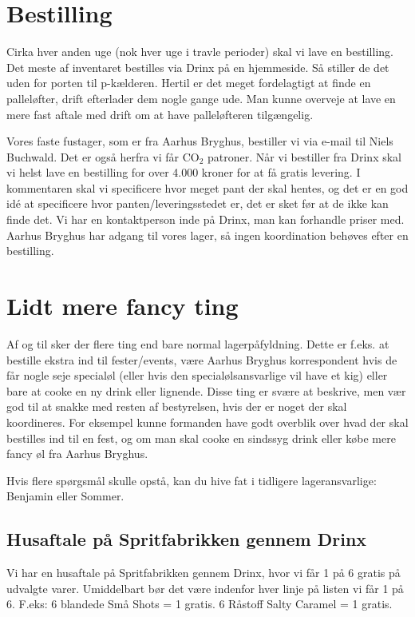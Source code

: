 \section{Bestilling}

Cirka hver anden uge (nok hver uge i travle perioder) skal vi lave en bestilling. Det meste af inventaret bestilles via Drinx på en hjemmeside. Så stiller de det uden for porten til p-kælderen. Hertil er det meget fordelagtigt at finde en palleløfter, drift efterlader dem nogle gange ude. Man kunne overveje at lave en mere fast aftale med drift om at have palleløfteren tilgængelig.

Vores faste fustager, som er fra Aarhus Bryghus, bestiller vi via e-mail til Niels Buchwald. Det er også herfra vi får CO$_2$ patroner.
Når vi bestiller fra Drinx skal vi helst lave en bestilling for over 4.000 kroner for at få gratis levering. I kommentaren skal vi specificere hvor meget pant der skal hentes, og det er en god idé at specificere hvor panten/leveringsstedet er, det er sket før at de ikke kan finde det. Vi har en kontaktperson inde på Drinx, man kan forhandle priser med.
Aarhus Bryghus har adgang til vores lager, så ingen koordination behøves efter en bestilling. 

\section{Lidt mere fancy ting}
Af og til sker der flere ting end bare normal lagerpåfyldning. Dette er f.eks. at bestille ekstra ind til fester/events, være Aarhus Bryghus korrespondent hvis de får nogle seje specialøl (eller hvis den specialølsansvarlige vil have et kig) eller bare at cooke en ny drink eller lignende. Disse ting er svære at beskrive, men vær god til at snakke med resten af bestyrelsen, hvis der er noget der skal koordineres. For eksempel kunne formanden have godt overblik over hvad der skal bestilles ind til en fest, og om man skal cooke en sindssyg drink eller købe mere fancy øl fra Aarhus Bryghus.

Hvis flere spørgsmål skulle opstå, kan du hive fat i tidligere lageransvarlige: Benjamin eller Sommer.

\subsection{Husaftale på Spritfabrikken gennem Drinx}
Vi har en husaftale på Spritfabrikken gennem Drinx, hvor vi får 1 på 6 gratis på udvalgte varer. Umiddelbart bør det være indenfor hver linje på listen vi får 1 på 6. F.eks: 6 blandede Små Shots = 1 gratis. 6 Råstoff Salty Caramel = 1 gratis. 

